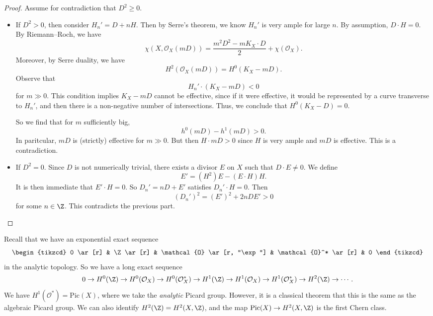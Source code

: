 \documentclass[a4paper]{article}
\newcommand\Pic{\mathrm{Pic}}
\begin{document}
\begin{proof}
  Assume for contradiction that $D^2 \geq 0$.
  \begin{itemize}
    \item If $D^2 > 0$, then consider $H_n' = D + nH$. Then by Serre's theorem, we know $H_n'$ is very ample for large $n$. By assumption, $D \cdot H = 0$. By Riemann--Roch, we have
      \[
        \chi(X, \mathcal{O}_X(mD)) = \frac{m^2 D^2 - m K_X \cdot D}{2} + \chi(\mathcal{O}_X).
      \]
      Moreover, by Serre duality, we have
      \[
        H^2(\mathcal{O}_X(mD)) = H^0(K_X - mD).
      \]
      Observe that
      \[
        H_n'\cdot (K_X - mD) < 0
      \]
      for $m \gg 0$. This condition implies $K_X - mD$ cannot be effective, since if it were effective, it would be represented by a curve transverse to $H_n'$, and then there is a non-negative number of intersections. Thus, we conclude that $H^0(K_X - D) = 0$.

      So we find that for $m$ sufficiently big,
      \[
        h^0(mD) - h^1(mD) > 0.
      \]
      In paritcular, $mD$ is (strictly) effective for $m \gg 0$. But then $H \cdot mD > 0$ since $H$ is very ample and $mD$ is effective. This is a contradiction.
    \item If $D^2 = 0$. Since $D$ is not numerically trivial, there exists a divisor $E$ on $X$ such that $D \cdot E \not= 0$. We define
      \[
        E' = (H^2) E - (E \cdot H) H.
      \]
      It is then immediate that $E' \cdot H = 0$. So $D_n' = nD + E'$ satisfies $D_n' \cdot H = 0$. Then
      \[
        (D_n')^2 = (E')^2 + 2n DE' > 0
      \]
      for some $n \in \Z$. This contradicts the previous part.\qedhere
  \end{itemize}
\end{proof}

Recall that we have an exponential exact sequence
\[
  \begin{tikzcd}
    0 \ar[r] & \Z \ar[r] & \mathcal{O} \ar[r, "\exp"] & \mathcal{O}^* \ar[r] & 0
  \end{tikzcd}
\]
in the analytic topology. So we have a long exact sequence
\[
  0 \to H^0(\Z) \to H^0(\mathcal{O}_X) \to H^0(\mathcal{O}_X^*) \to H^1(\Z) \to H^1(\mathcal{O}_X) \to H^1(\mathcal{O}_X^*) \to H^2(\Z) \to \cdots.
\]
We have $H^1(\mathcal{O}^*) = \Pic(X)$, where we take the \emph{analytic} Picard group. However, it is a classical theorem that this is the same as the algebraic Picard group. We can also identify $H^2(\Z) = H^2(X, \Z)$, and the map $\Pic(X) \to H^2(X, \Z)$ is the first Chern class.
\end{document}

